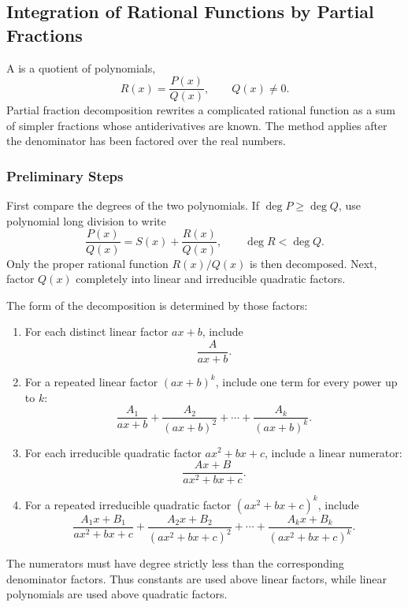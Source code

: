 \subsection{Integration of Rational Functions by Partial Fractions}

A  is a quotient of polynomials,
\[
    R(x)=\frac{P(x)}{Q(x)},
    \qquad Q(x)\neq0.
\]
Partial fraction decomposition rewrites a complicated rational function as a
sum of simpler fractions whose antiderivatives are known.  The method applies
after the denominator has been factored over the real numbers.

\subsubsection{Preliminary Steps}

First compare the degrees of the two polynomials.  If
\(\deg P\geq\deg Q\), use polynomial long division to write
\[
    \frac{P(x)}{Q(x)}
    =S(x)+\frac{R(x)}{Q(x)},
    \qquad \deg R<\deg Q.
\]
Only the proper rational function \(R(x)/Q(x)\) is then decomposed.  Next,
factor \(Q(x)\) completely into linear and irreducible quadratic factors.

The form of the decomposition is determined by those factors:

\begin{enumerate}
    \item For each distinct linear factor \(ax+b\), include
    \[
        \frac{A}{ax+b}.
    \]

    \item For a repeated linear factor \((ax+b)^k\), include one term for
    every power up to \(k\):
    \[
        \frac{A_1}{ax+b}
        +\frac{A_2}{(ax+b)^2}
        +\cdots
        +\frac{A_k}{(ax+b)^k}.
    \]

    \item For each irreducible quadratic factor \(ax^2+bx+c\), include a
    linear numerator:
    \[
        \frac{Ax+B}{ax^2+bx+c}.
    \]

    \item For a repeated irreducible quadratic factor
    \((ax^2+bx+c)^k\), include
    \[
        \frac{A_1x+B_1}{ax^2+bx+c}
        +\frac{A_2x+B_2}{(ax^2+bx+c)^2}
        +\cdots
        +\frac{A_kx+B_k}{(ax^2+bx+c)^k}.
    \]
\end{enumerate}

The numerators must have degree strictly less than the corresponding
denominator factors.  Thus constants are used above linear factors, while
linear polynomials are used above quadratic factors.

